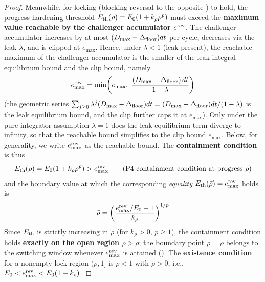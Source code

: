 \begin{proof}
Meanwhile, for locking (blocking reversal to the opposite \Class) to hold, the progress-hardening threshold $E_{\text{th}}(\rho) = E_0(1+k_\rho \rho^p)$ must exceed the \textbf{maximum value reachable by the challenger accumulator $e^{\text{rev}}$}. The challenger accumulator increases by at most $(D_{\max}-\Delta_{\text{floor}})dt$ per cycle, decreases via the leak $\lambda$, and is clipped at $e_{\max}$. Hence, under $\lambda < 1$ (leak present), the reachable maximum of the challenger accumulator is the smaller of the leak-integral equilibrium bound and the clip bound, namely
\begin{equation}
\Eremax = \min\!\left(e_{\max},\ \frac{(D_{\max}-\Dfloor)\, dt}{1-\lambda}\right)
\label{eq:eremax}
\end{equation}
(the geometric series $\sum_{j\ge0} \lambda^j (D_{\max}-\Delta_{\text{floor}})dt = (D_{\max}-\Delta_{\text{floor}})dt/(1-\lambda)$ is the leak equilibrium bound, and the clip further caps it at $e_{\max}$). Only under the pure-integrator assumption $\lambda = 1$ does the leak-equilibrium term diverge to infinity, so that the reachable bound simplifies to the clip bound $e_{\max}$. Below, for generality, we write $e^{\text{rev}}_{\max}$ as the reachable bound. The \textbf{containment condition} is thus
\begin{equation}
E_{\text{th}}(\rho) = E_0(1+k_\rho \rho^p) > e^{\text{rev}}_{\max} \qquad \text{(P4 containment condition at progress $\rho$)}
\end{equation}
and the boundary value at which the corresponding \emph{equality} $E_{\text{th}}(\bar\rho) = e^{\text{rev}}_{\max}$ holds is
\begin{equation}
\bar\rho = \left(\frac{e^{\text{rev}}_{\max}/E_0 - 1}{k_\rho}\right)^{1/p}
\end{equation}
Since $E_{\text{th}}$ is strictly increasing in $\rho$ (for $k_\rho > 0$, $p \ge 1$), the containment condition holds \textbf{exactly on the open region $\rho > \bar\rho$}; the boundary point $\rho = \bar\rho$ belongs to the switching window whenever $e^{\text{rev}}_{\max}$ is attained (). The \textbf{existence condition} for a nonempty lock region $(\bar\rho, 1]$ is $\bar\rho < 1$ with $\bar\rho > 0$, i.e., $E_0 < e^{\text{rev}}_{\max} < E_0(1+k_\rho)$.


\end{proof}
